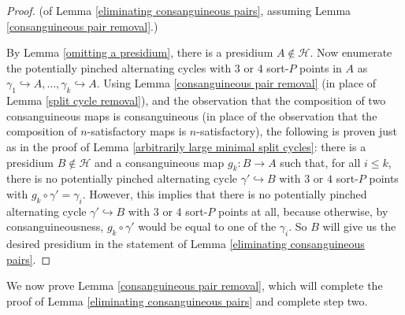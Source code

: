 \documentclass{amsart}
\theoremstyle{definition}
\theoremstyle{remark}
\numberwithin{equation}{section}
\begin{document}
\begin{proof}
    (of Lemma \ref{eliminating consanguineous pairs}, assuming Lemma \ref{consanguineous pair removal}.)
    
    
    
By Lemma \ref{omitting a presidium}, there is a presidium $A  \notin \mathcal{H}$. Now enumerate the potentially pinched alternating cycles with $3$ or $4$ sort-$P$ points in $A$ as $\gamma_1 \hookrightarrow A, \ldots, \gamma_k \hookrightarrow A$. Using Lemma \ref{consanguineous pair removal} (in place of Lemma \ref{split cycle removal}), and the observation that the composition of two consanguineous maps is consanguineous (in place of the observation that the composition of $n$-satisfactory maps is $n$-satisfactory), the following is proven just as in the proof of Lemma \ref{arbitrarily large minimal split cycles}: there is a presidium $B \notin \mathcal{H}$ and a consanguineous map $g_k: B \to A$ such that, for all $i \leq k$, there is no potentially pinched alternating cycle $\gamma' \hookrightarrow B$ with $3$ or $4$ sort-$P$ points with $g_k \circ \gamma' = \gamma_i$. However, this implies that there is no potentially pinched alternating cycle $\gamma' \hookrightarrow B$ with $3$ or $4$ sort-$P$ points at all, because otherwise, by consanguineousness, $g_{k} \circ \gamma'$ would be equal to one of the $\gamma_i$. So $B$ will give us the desired presidium in the statement of Lemma \ref{eliminating consanguineous pairs}.
\end{proof}

We now prove Lemma \ref{consanguineous pair removal}, which will complete the proof of Lemma \ref{eliminating consanguineous pairs} and complete step two.
\end{document}
